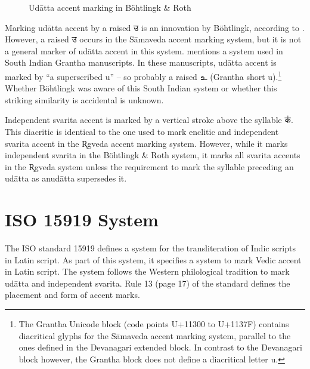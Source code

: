 \begin{figure}[!ht]
\begin{center}
\end{center}
\caption[Udātta accent marking in Böhtlingk \& Roth]{\label{fig:agotA2}Udātta accent marking in Böhtlingk \& Roth}
\end{figure}

Marking udātta accent by a raised {\devfont उ} is an innovation by Böhtlingk, according to \citet[p.~30]{Whitney1889}. However, a raised {\devfont उ} occurs in the Sāmaveda accent marking system, but it is not a general marker of udātta accent in this system. \citet[p.~485]{Witzel1974} mentions a system used in South Indian Grantha manuscripts. In these manuscripts, udātta accent is marked by “a superscribed u” – so probably a raised {\tamfont உ} (Grantha short u).\footnote{The Grantha Unicode block (code points U+11300 to U+1137F) contains diacritical glyphs for the Sāmaveda accent marking system, parallel to the ones defined in the Devanagari extended block. In contrast to the Devanagari block however, the Grantha block does not define a diacritical letter u.}  Whether Böhtlingk was aware of this South Indian system or whether this striking similarity is accidental is unknown.

Independent svarita accent is marked by a vertical stroke above the syllable {\devfont क॑}. This diacritic is identical to the one used to mark enclitic and independent svarita accent in the R̥gveda accent marking system. However, while it marks independent svarita in the Böhtlingk \& Roth system, it marks all svarita accents in the R̥gveda system unless the requirement to mark the syllable preceding an udātta as anudātta supersedes it.

\section{ISO 15919 System}

The ISO standard 15919 defines a system for the transliteration of Indic scripts in Latin script. As part of this system, it specifies a system to mark Vedic accent in Latin script. The system follows the Western philological tradition to mark udātta and independent svarita. Rule 13 (page 17) of the standard defines the placement and form of accent marks.

